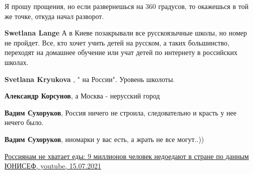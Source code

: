 \begin{itemize}
\begin{itemize}
Я прошу прощения, но если развернешься на 360 градусов, то окажешься в той же точке, откуда начал разворот.

 
\textbf{Swetlana Lange} А в Киеве позакрывали все русскоязычные школы, но номер не пройдет. Все, кто хочет учить детей на русском, а таких большинство, переходят на домашнее обучение или учат детей по интернету в российских школах.

 
\textbf{Svetlana Kryukova} , " на России". Уровень школоты.

 
\textbf{Александр Корсунов}, а Москва - нерусский город

 
\textbf{Вадим Сухоруков}, Россия ничего не строила, следовательно и красть у нее нечего было.

 
\textbf{Вадим Сухоруков}, иномарки у вас есть, а жрать не все могут..))

\href{https://www.youtube.com/watch?v=OkEuCu8lQS0}{%
Россиянам не хватает еды: 9 миллионов человек недоедают в стране по данным ЮНИСЕФ, youtube, 15.07.2021}

 

\end{itemize}
\end{itemize}
